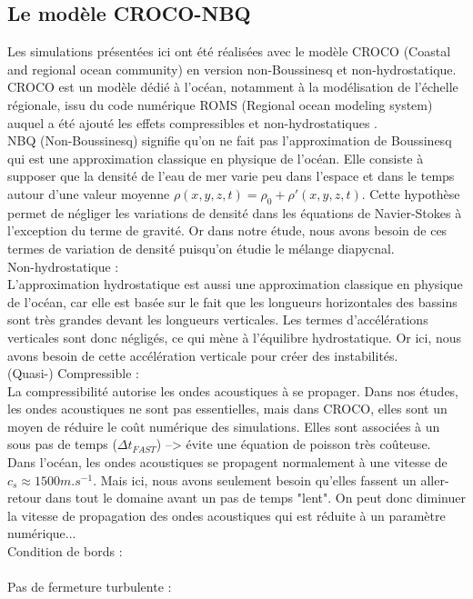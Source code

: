 \documentclass[a4paper,12pt]{article}
\begin{document}
    \subsection{Le modèle CROCO-NBQ}
    
    Les simulations présentées ici ont été réalisées avec le modèle CROCO (Coastal and regional ocean community) en version non-Boussinesq et non-hydrostatique.
    CROCO est un modèle dédié à l'océan, notamment à la modélisation de l'échelle régionale, issu du code numérique ROMS (Regional ocean modeling system) auquel a été ajouté les effets compressibles et non-hydrostatiques \citep{auclair_non-hydrostatic_2018}. \\
    \newline
    NBQ (Non-Boussinesq) signifie qu'on ne fait pas l'approximation de Boussinesq qui est une approximation classique en physique de l'océan. Elle consiste à supposer que la densité de l'eau de mer varie peu dans l'espace et dans le temps autour d'une valeur moyenne $\rho(x,y,z,t)=\rho_{0}+\rho'(x,y,z,t)$. Cette hypothèse permet de négliger les variations de densité dans les équations de Navier-Stokes à l'exception du terme de gravité. Or dans notre étude, nous avons besoin de ces termes de variation de densité puisqu'on étudie le mélange diapycnal. \\
    \newline
    Non-hydrostatique :\\
    L'approximation hydrostatique est aussi une approximation classique en physique de l'océan, car elle est basée sur le fait que les longueurs horizontales des bassins sont très grandes devant les longueurs verticales. Les termes d'accélérations verticales sont donc négligés, ce qui mène à l'équilibre hydrostatique. Or ici, nous avons besoin de cette accélération verticale pour créer des instabilités. \\
    \newline
    \color{blue}
    (Quasi-) Compressible :\\ 
    La compressibilité autorise les ondes acoustiques à se propager. Dans nos études, les ondes acoustiques ne sont pas essentielles, mais dans CROCO, elles sont un moyen de réduire le coût numérique des simulations. Elles sont associées à un sous pas de temps ($\Delta t_{FAST}$) --> évite une équation de poisson très coûteuse. \\
    Dans l'océan, les ondes acoustiques se propagent normalement à une vitesse de $c_s \approx 1500 m.s^{-1}$. Mais ici, nous avons seulement besoin qu'elles fassent un aller-retour dans tout le domaine avant un pas de temps "lent". On peut donc diminuer la vitesse de propagation des ondes acoustiques qui est réduite à un paramètre numérique... \\
    \newline
    Condition de bords :\\
     \\
    \newline
    Pas de fermeture turbulente :\\
    \color{black}
\end{document}
